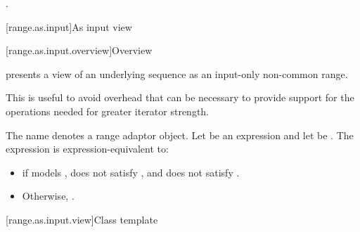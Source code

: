 \begin{itemdescr}
\pnum
\returns
{}.
\end{itemdescr}

[range.as.input]{As input view}

[range.as.input.overview]{Overview}

\pnum
{} presents a view of an underlying sequence
as an input-only non-common range.
\begin{note}
This is useful to avoid overhead
that can be necessary to provide support for the operations
needed for greater iterator strength.
\end{note}

\pnum
The name  denotes
a range adaptor object.
Let  be an expression and let  be .
The expression  is expression-equivalent to:
\begin{itemize}
\item
{}
if  models ,
does not satisfy , and
does not satisfy .
\item
Otherwise, .
\end{itemize}

[range.as.input.view]{Class template }

